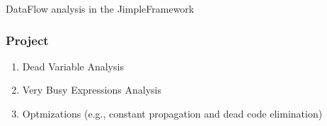 \begin{frame}
 \huge{DataFlow analysis in the JimpleFramework}
\end{frame}

\begin{frame}
  \frametitle{Project}

  \begin{enumerate}[G1]
   \item Dead Variable Analysis
   \item Very Busy Expressions Analysis
   \item Optmizations (e.g., constant propagation and dead code elimination) 
  \end{enumerate}
\end{frame}